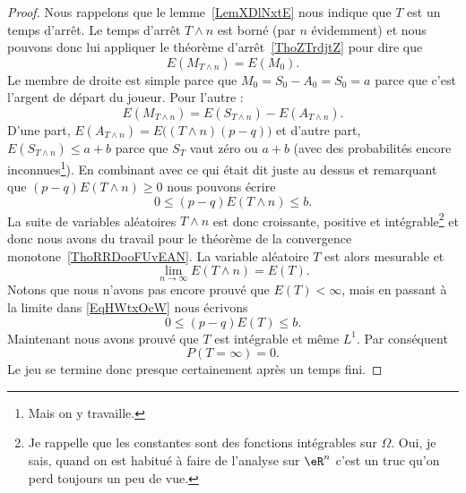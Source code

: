 \begin{proof}
    Nous rappelons que le lemme~\ref{LemXDlNxtE} nous indique que \( T\) est un temps d'arrêt. Le temps d'arrêt \( T\wedge n\) est borné (par \( n\) évidemment) et nous pouvons donc lui appliquer le théorème d'arrêt~\ref{ThoZTrdjtZ} pour dire que
    \begin{equation}
        E(M_{T\wedge n})=E(M_0).
    \end{equation}
    Le membre de droite est simple parce que \( M_0=S_0-A_0=S_0=a\) parce que c'est l'argent de départ du joueur. Pour l'autre :
    \begin{equation}    \label{EqKEkJvBg}
        E(M_{T\wedge n})=E(S_{T\wedge n})-E(A_{T\wedge n}).
    \end{equation}
    D'une part, \( E(A_{T\wedge n})=E\big( (T\wedge n)(p-q) \big)\) et d'autre part, \( E(S_{T\wedge n})\leq a+b\) parce que \( S_T\) vaut zéro ou \( a+b\) (avec des probabilités encore inconnues\footnote{Mais on y travaille.}). En combinant avec ce qui était dit juste au dessus et remarquant que \( (p-q)E(T\wedge n)\geq 0\) nous pouvons écrire
    \begin{equation}    \label{EqHWtxOcW}
        0\leq (p-q)E(T\wedge n)\leq b.
    \end{equation}
    La suite de variables aléatoires \( T\wedge n\) est donc croissante, positive et intégrable\footnote{Je rappelle que les constantes sont des fonctions intégrables sur \( \Omega\). Oui, je sais, quand on est habitué à faire de l'analyse sur \( \eR^n\) c'est un truc qu'on perd toujours un peu de vue.} et donc nous avons du travail pour le théorème de la convergence monotone~\ref{ThoRRDooFUvEAN}. La variable aléatoire \( T\) est alors mesurable et
    \begin{equation}    \label{EqABPXmgr}
        \lim_{n\to \infty} E(T\wedge n)=E(T).
    \end{equation}
    Notons que nous n'avons pas encore prouvé que \( E(T)<\infty\), mais en passant à la limite dans \eqref{EqHWtxOcW} nous écrivons
    \begin{equation}
        0\leq (p-q)E(T)\leq b.
    \end{equation}
    Maintenant nous avons prouvé que \( T\) est intégrable et même \( L^1\). Par conséquent
    \begin{equation}
        P(T=\infty)=0.
    \end{equation}
    Le jeu se termine donc presque certainement après un temps fini.
\end{proof}

